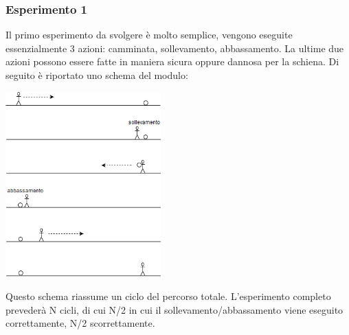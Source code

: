\documentclass[a4paper]{article}
\begin{document}
	\subsubsection{Esperimento 1}
Il primo esperimento da svolgere è molto semplice, vengono eseguite essenzialmente 3 azioni: camminata, sollevamento, abbassamento.
La ultime due azioni possono essere fatte in maniera sicura oppure dannosa per la schiena.
Di seguito è riportato uno schema del modulo:\\

\begin{center}
	\includegraphics[width=60mm,scale=0.7]{./images/esperimento1.png} 
	\makebox[\linewidth]{}
\end{center} 
Questo schema riassume un ciclo del percorso totale. L’esperimento completo prevederà N cicli, di cui N/2 in cui il sollevamento/abbassamento viene eseguito correttamente, N/2 scorrettamente.

\end{document}
